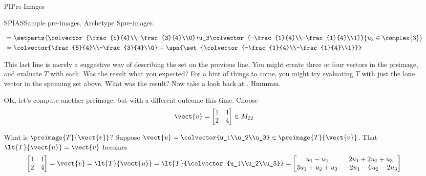 \begin{subsect}{PI}{Pre-Images}
\begin{example}{SPIAS}{Sample pre-images, Archetype S}{pre-images}
\begin{para}
\begin{align*}
&=\setparts{\colvector{\frac{5}{4}\\-\frac{3}{4}\\0}+u_3\colvector{-\frac{1}{4}\\-\frac{1}{4}\\1}}{u_3\in\complex{3}}\\
&=\colvector{\frac{5}{4}\\-\frac{3}{4}\\0}+\spn{\set{\colvector{-\frac{1}{4}\\-\frac{1}{4}\\1}}}
\end{align*}
\end{para}
%
\begin{para}This last line is merely a suggestive way of describing the set on the previous line.  You might create three or four vectors in the preimage, and evaluate $T$ with each.  Was the result what you expected?  For a hint of things to come, you might try evaluating $T$ with just the lone vector in the spanning set above.  What was the result?  Now take a look back at .  Hmmmm.\end{para}
%
\begin{para}OK, let's compute another preimage, but with a different outcome this time.
Choose
%
\begin{equation*}
\vect{v}=
\begin{bmatrix}
1&1\\2&4
\end{bmatrix}
\in M_{22}
\end{equation*}
\end{para}
%
\begin{para}What is $\preimage{T}{\vect{v}}$?  Suppose $\vect{u}=\colvector{u_1\\u_2\\u_3}\in\preimage{T}{\vect{v}}$.  That $\lt{T}{\vect{u}}=\vect{v}$ becomes
%
\begin{equation*}
\begin{bmatrix}
1&1\\2&4
\end{bmatrix}
=\vect{v}
=\lt{T}{\vect{u}}
=\lt{T}{\colvector{u_1\\u_2\\u_3}}\\
=\begin{bmatrix}
u_1-u_2&2u_1+2u_2+u_3\\
3u_1+u_2+u_3&-2u_1-6u_2-2u_3
\end{bmatrix}
\end{equation*}

\end{para}
\end{example}
\end{subsect}
